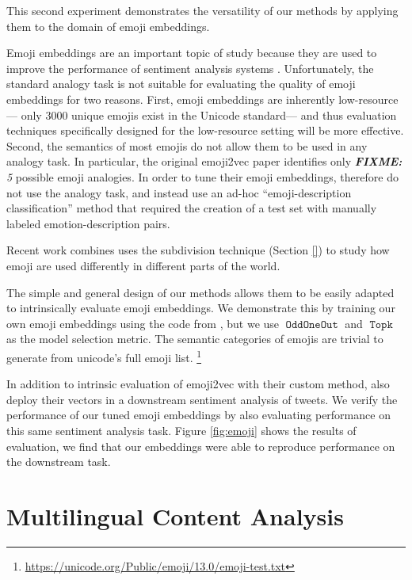\documentclass[11pt,a4paper]{article}
\DeclareMathOperator{\OddOneOut}{\texttt{OddOneOut}}
\DeclareMathOperator{\topk}{\texttt{Topk}}
\newcommand{\fixme}[1]{{\color{red}\itshape \textbf{FIXME:} {#1}}}
\begin{document}
This second experiment demonstrates the versatility of our methods by applying them to the domain of emoji embeddings.

Emoji embeddings are an important topic of study because they are used to improve the performance of sentiment analysis systems \cite[e.g.]{felbo2017using,barbieri2017emojis,ai2017untangling,wijeratne2017semantics,al2019smile,eisner2016emoji2vec}. 
Unfortunately,
the standard analogy task is not suitable for evaluating the quality of emoji embeddings for two reasons.
First, emoji embeddings are inherently low-resource---%
only 3000 unique emojis exist in the Unicode standard---%
and thus evaluation techniques specifically designed for the low-resource setting will be more effective.
Second, the semantics of most emojis do not allow them to be used in any analogy task.
In particular, the original emoji2vec paper \cite{eisner2016emoji2vec} identifies only \fixme{5} possible emoji analogies.
In order to tune their emoji embeddings, \citet{eisner2016emoji2vec} therefore do not use the analogy task,
and instead use an ad-hoc ``emoji-description classification'' method that required the creation of a test set with manually labeled emotion-description pairs.


Recent work \citet{guntuku2019studying} combines uses the subdivision technique (Section \ref{}) to study how emoji are used differently in different parts of the world.

The simple and general design of our methods allows them to be easily adapted to intrinsically evaluate emoji embeddings.
We demonstrate this by training our own emoji embeddings using the code from \citet{eisner2016emoji2vec},
but we use $\OddOneOut$ and $\topk$ as the model selection metric.
The semantic categories of emojis are trivial to generate from unicode's full emoji list.%
\footnote{\url{https://unicode.org/Public/emoji/13.0/emoji-test.txt}} 

In addition to intrinsic evaluation of emoji2vec with their custom method, \cite{eisner2016emoji2vec} also deploy their vectors in a downstream sentiment analysis of tweets.
We verify the performance of our tuned emoji embeddings by also evaluating performance on this same sentiment analysis task.
Figure \ref{fig:emoji} shows the results of evaluation, we find that our embeddings were able to reproduce \cite{eisner2016emoji2vec} performance on the downstream task.


\section{Multilingual Content Analysis}
\label{sec:mca}
\end{document}
